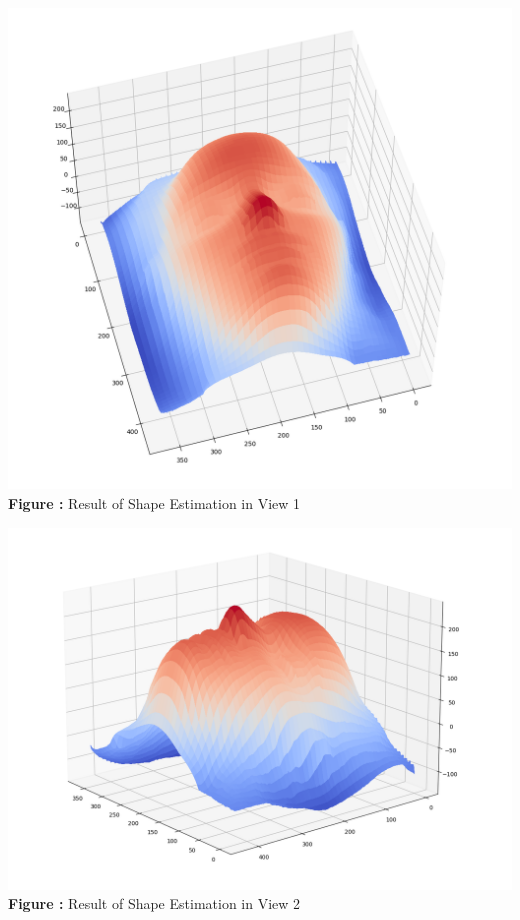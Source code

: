 \documentclass{article}
\begin{document}
	\begin{minipage}{1\linewidth}
	\centering
	\includegraphics[width=0.8\columnwidth, height=0.6\linewidth]{./Q1_i_res1.png}
	  \\%
	\textbf{Figure \thefigure:} Result of Shape Estimation in View 1  %
	\label{fig:Q1_i_res1}         %
	\end{minipage}
	
	\begin{minipage}{1\linewidth}
	\centering
	\includegraphics[width=0.8\columnwidth, height=0.6\linewidth]{./Q1_i_res2.png}
	  \\%
	\textbf{Figure \thefigure:} Result of Shape Estimation in View 2  %
	\label{fig:Q1_i_res2}         %
	\end{minipage}	
	
\end{document}
